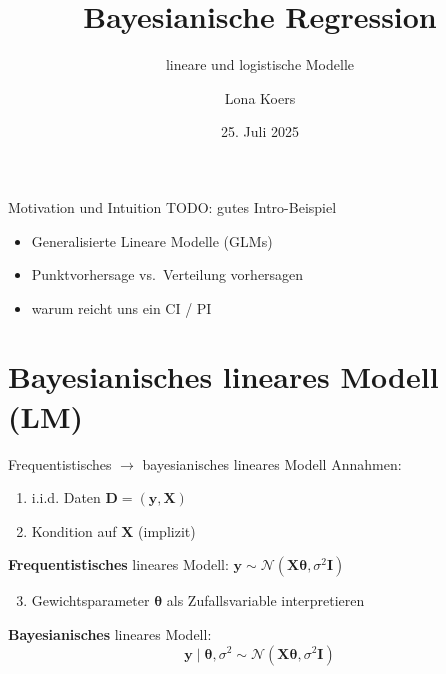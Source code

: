 \documentclass[
  ignorenonframetext,
  aspectratio=169,
]{beamer}
\title{Bayesianische Regression}
\subtitle{lineare und logistische Modelle}
\author{Lona Koers}
\date{25. Juli 2025}
\institute{LMU}
\providecommand{\tightlist}{%
  \setlength{\itemsep}{0pt}\setlength{\parskip}{0pt}}
\newcommand{\by}{\bm{y}}
\newcommand{\bD}{\bm{D}}
\newcommand{\bI}{\bm{I}}
\newcommand{\bX}{\bm{X}}
\newcommand{\Ncal}{\mathcal{N}}
\newcommand{\ssd}{\sigma^2}
\newcommand{\btheta}{\bm{\theta}}
\begin{document}
\frame{\titlepage}

\begin{frame}{Motivation und Intuition}
\protect{}\label{motivation-und-intuition}
TODO: gutes Intro-Beispiel

\begin{itemize}
\item
  Generalisierte Lineare Modelle (GLMs)
\item
  Punktvorhersage vs.~Verteilung vorhersagen
\item
  warum reicht uns ein CI / PI
\end{itemize}
\end{frame}

\section{\texorpdfstring{Bayesianisches \textbf{lineares} Modell
(LM)}{Bayesianisches lineares Modell (LM)}}\label{bayesianisches-lineares-modell-lm}

\begin{frame}{Frequentistisches \(\to\) bayesianisches lineares Modell}
\protect{}\label{frequentistisches-to-bayesianisches-lineares-modell}
Annahmen:

\begin{enumerate}
\tightlist
\item
  i.i.d. Daten \(\bD = (\by, \bX)\)
\item
  Kondition auf \(\bX\) (implizit)
\end{enumerate}

\textbf{Frequentistisches} lineares Modell:
\(\by \sim \Ncal(\bX \btheta, \ssd \bI)\)

\begin{enumerate}
\setcounter{enumi}{2}
\tightlist
\item
  Gewichtsparameter \(\btheta\) als Zufallsvariable interpretieren
\end{enumerate}

\begin{block}{\textbf{Bayesianisches} lineares Modell:}
\protect{}\label{bayesianisches-lineares-modell}
\[\by \mid \btheta, \ssd \sim \Ncal(\bX \btheta, \ssd \bI)\]
\end{block}
\end{frame}
\end{document}
